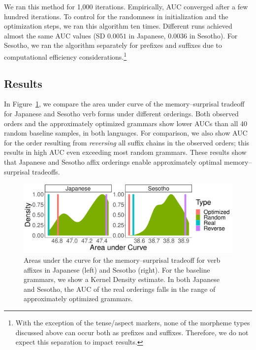 We ran this method for 1,000 iterations. Empirically, AUC converged after a few hundred iterations.
To control for the randomness in initialization and the optimization steps, we ran this algorithm ten times.
Different runs achieved almost the same AUC values (SD $0.0051$ in Japanese, $0.0036$ in Sesotho). %
For Sesotho, we ran the algorithm separately for prefixes and suffixes due to computational efficiency considerations.\footnote{With the exception of the tense/aspect markers, none of the morpheme types discussed above can occur both as prefixes and suffixes. Therefore, we do not expect this separation to impact results.}

\subsection{Results}
In Figure~\ref{fig:morph-auc}, we compare the area under curve of the memory--surprisal tradeoff for Japanese and Sesotho verb forms under different orderings.
Both observed orders and the approximately optimized grammars show lower AUCs than all 40 random baseline samples, in both languages.
For comparison, we also show AUC for the order resulting from \emph{reversing} all suffix chains in the observed orders; this results in high AUC even exceeding most random grammars.
These results show that Japanese and Sesotho affix orderings enable approximately optimal memory--surprisal tradeoffs.



\begin{figure}
	\begin{center}
\includegraphics[width=\textwidth]{figures/Both-suffixes-byMorphemes-auc-hist-heldout.pdf}
\end{center}
	\caption{Areas under the curve for the memory--surprisal tradeoff for verb affixes in Japanese (left) and Sesotho (right). For the baseline grammars, we show a Kernel Density estimate.
	In both Japanese and Sesotho, the AUC of the real orderings falls in the range of approximately optimized grammars.}
	\label{fig:morph-auc}
\end{figure}



